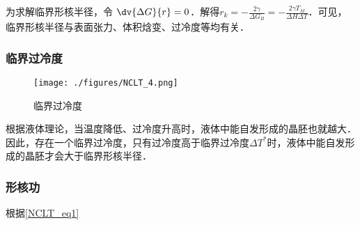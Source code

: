 为求解临界形核半径，令 $\dv{\Delta G}{r} = 0$．解得$r_k=-\frac{2\gamma}{\Delta G_B}=-\frac{2\gamma T_M}{\Delta H \Delta T}$．可见，临界形核半径与表面张力、体积焓变、过冷度等均有关．

\subsubsection{临界过冷度}
\begin{issues}
\end{issues}

\begin{figure}[ht]
\centering
\texttt{[image: ./figures/NCLT\_4.png]}
\caption{临界过冷度} \label{NCLT_fig4}
\end{figure}
根据液体理论，当温度降低、过冷度升高时，液体中能自发形成的晶胚也就越大．因此，存在一个临界过冷度，只有过冷度高于临界过冷度$\Delta T^*$时，液体中能自发形成的晶胚才会大于临界形核半径．

\subsubsection{形核功}
根据\autoref{NCLT_eq1} 